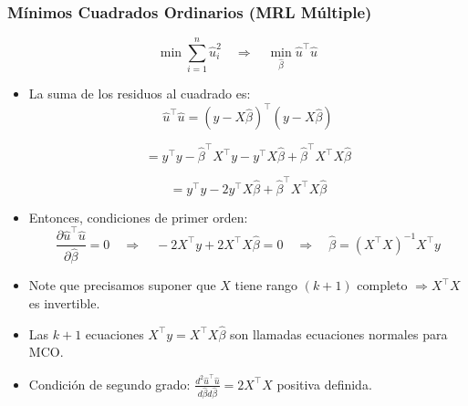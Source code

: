 \documentclass{beamer}
\begin{document}
\begin{frame}[shrink=10]
\frametitle{Mínimos Cuadrados Ordinarios (MRL Múltiple)}

\[ \min \sum_{i=1}^{n} \hat{u}_i^2 \quad \Rightarrow \quad \min_{\hat{\beta}} \hat{u}^\top \hat{u} \]
\begin{itemize}
    \item La suma de los residuos al cuadrado es:
    \[ \hat{u}^\top \hat{u} = (y - X \hat{\beta})^\top (y - X \hat{\beta}) \]
    
    \[ = y^\top y - \hat{\beta}^\top X^\top y - y^\top X \hat{\beta} + \hat{\beta}^\top X^\top X \hat{\beta} \]
    
    \[ = y^\top y - 2 y^\top X \hat{\beta} + \hat{\beta}^\top X^\top X \hat{\beta} \]
    
    
    \item Entonces, condiciones de primer orden:
    \[ \frac{\partial \hat{u}^\top \hat{u}}{\partial \hat{\beta}} = 0 \quad \Rightarrow \quad -2X^\top y + 2X^\top X \hat{\beta} = 0 \quad \Rightarrow \quad \hat{\beta} = (X^\top X)^{-1} X^\top y \]
    
    \item Note que precisamos suponer que $X$ tiene rango $(k+1)$ completo $\Rightarrow X^\top X$ es invertible.
    
    \item Las $k + 1$ ecuaciones $X^\top y = X^\top X \hat{\beta}$ son llamadas ecuaciones normales para MCO.
    
    \item Condición de segundo grado: $\frac{d^2 \hat{u}^\top \hat{u}}{d \hat{\beta} d \hat{\beta}} = 2X^\top X$ positiva definida.

 
\end{itemize}

\end{frame}


\end{document}
